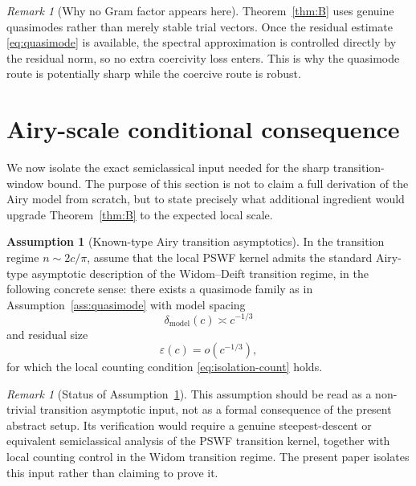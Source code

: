 \documentclass[12pt,a4paper]{amsart}
\theoremstyle{definition}
\newtheorem{assumption}[theorem]{Assumption}
\theoremstyle{remark}
\newtheorem{remark}[theorem]{Remark}
\begin{document}
\begin{remark}[Why no Gram factor appears here]
Theorem~\ref{thm:B} uses genuine quasimodes rather than merely stable trial
vectors.
Once the residual estimate \eqref{eq:quasimode} is available, the spectral
approximation is controlled directly by the residual norm, so no extra
coercivity loss enters.
This is why the quasimode route is potentially sharp while the coercive
route is robust.
\end{remark}

\section{Airy-scale conditional consequence}
\label{sec:airy}

We now isolate the exact semiclassical input needed for the sharp
transition-window bound.
The purpose of this section is not to claim a full derivation of the Airy
model from scratch, but to state precisely what additional ingredient would
upgrade Theorem~\ref{thm:B} to the expected local scale.

\begin{assumption}[Known-type Airy transition asymptotics]
\label{ass:airy}
In the transition regime $n\sim 2c/\pi$, assume that the local PSWF kernel
admits the standard Airy-type asymptotic description of the Widom--Deift
transition regime, in the following concrete sense:
there exists a quasimode family as in Assumption~\ref{ass:quasimode} with
model spacing
\begin{equation}\label{eq:airy-gap}
  \delta_{\mathrm{model}}(c) \asymp c^{-1/3}
\end{equation}
and residual size
\begin{equation}\label{eq:airy-error}
  \varepsilon(c) = o(c^{-1/3}),
\end{equation}
for which the local counting condition \eqref{eq:isolation-count} holds.
\end{assumption}

\begin{remark}[Status of Assumption~\ref{ass:airy}]
This assumption should be read as a non-trivial transition asymptotic input,
not as a formal consequence of the present abstract setup.
Its verification would require a genuine steepest-descent or equivalent
semiclassical analysis of the PSWF transition kernel, together with local
counting control in the Widom transition regime.
The present paper isolates this input rather than claiming to prove it.
\end{remark}
\end{document}

